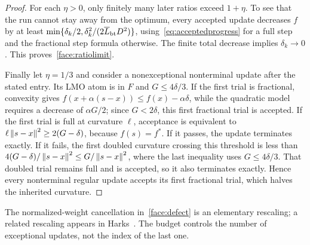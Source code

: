 \begin{proof}
For each $\eta>0$, only finitely many later ratios exceed $1+\eta$.
To see that the run cannot stay away from the optimum, every accepted
update decreases $f$ by at least
$\min\{\delta_k/2,\delta_k^2/(2\overline L_{\rm bt}D^2)\}$,
using~\eqref{eq:acceptedprogress} for a full step and the fractional
step formula otherwise. The finite total decrease implies
$\delta_k\to0$. This proves~\eqref{face:ratiolimit}.

Finally let $\eta=1/3$ and consider a nonexceptional nonterminal
update after the stated entry. Its LMO atom is in $F$ and
$G\le4\delta/3$. If the first trial is fractional, convexity gives
$f(x+\alpha(s-x))\le f(x)-\alpha\delta$, while the quadratic
model requires a decrease of $\alpha G/2$; since $G<2\delta$, this
first fractional trial is accepted. If the first trial is full at
curvature $\ell$, acceptance is equivalent to
$\ell\left\|s-x\right\|^2\ge2(G-\delta)$, because $f(s)=f^*$.
If it passes, the update terminates exactly. If it fails, the first
doubled curvature crossing this threshold is less than
$4(G-\delta)/\left\|s-x\right\|^2\le G/\left\|s-x\right\|^2$, where the last
inequality uses $G\le4\delta/3$. That doubled trial remains full and
is accepted, so it also terminates exactly. Hence every nonterminal
regular update accepts its first fractional trial, which halves the
inherited curvature.
\end{proof}

The normalized-weight cancellation in~\eqref{face:defect} is an
elementary rescaling; a related rescaling appears in
Harks~\cite[Section~3.2]{harks}. The budget controls the number of
exceptional updates, not the index of the last one.

